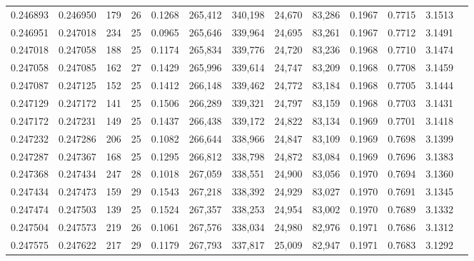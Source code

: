 \begin{tabular}{rrrrrrrrrrrrr}
0.246893 & 0.246950 &   179 &  26 &                                     0.1268 & 265,412 & 340,198 &  24,670 &  83,286 & 0.1967 & 0.7715 & 3.1513 \\
0.246951 & 0.247018 &   234 &  25 &                                     0.0965 & 265,646 & 339,964 &  24,695 &  83,261 & 0.1967 & 0.7712 & 3.1491 \\
0.247018 & 0.247058 &   188 &  25 &                                     0.1174 & 265,834 & 339,776 &  24,720 &  83,236 & 0.1968 & 0.7710 & 3.1474 \\
0.247058 & 0.247085 &   162 &  27 &                                     0.1429 & 265,996 & 339,614 &  24,747 &  83,209 & 0.1968 & 0.7708 & 3.1459 \\
0.247087 & 0.247125 &   152 &  25 &                                     0.1412 & 266,148 & 339,462 &  24,772 &  83,184 & 0.1968 & 0.7705 & 3.1444 \\
0.247129 & 0.247172 &   141 &  25 &                                     0.1506 & 266,289 & 339,321 &  24,797 &  83,159 & 0.1968 & 0.7703 & 3.1431 \\
0.247172 & 0.247231 &   149 &  25 &                                     0.1437 & 266,438 & 339,172 &  24,822 &  83,134 & 0.1969 & 0.7701 & 3.1418 \\
0.247232 & 0.247286 &   206 &  25 &                                     0.1082 & 266,644 & 338,966 &  24,847 &  83,109 & 0.1969 & 0.7698 & 3.1399 \\
0.247287 & 0.247367 &   168 &  25 &                                     0.1295 & 266,812 & 338,798 &  24,872 &  83,084 & 0.1969 & 0.7696 & 3.1383 \\
0.247368 & 0.247434 &   247 &  28 &                                     0.1018 & 267,059 & 338,551 &  24,900 &  83,056 & 0.1970 & 0.7694 & 3.1360 \\
0.247434 & 0.247473 &   159 &  29 &                                     0.1543 & 267,218 & 338,392 &  24,929 &  83,027 & 0.1970 & 0.7691 & 3.1345 \\
0.247474 & 0.247503 &   139 &  25 &                                     0.1524 & 267,357 & 338,253 &  24,954 &  83,002 & 0.1970 & 0.7689 & 3.1332 \\
0.247504 & 0.247573 &   219 &  26 &                                     0.1061 & 267,576 & 338,034 &  24,980 &  82,976 & 0.1971 & 0.7686 & 3.1312 \\
0.247575 & 0.247622 &   217 &  29 &                                     0.1179 & 267,793 & 337,817 &  25,009 &  82,947 & 0.1971 & 0.7683 & 3.1292 \\

\end{tabular}
